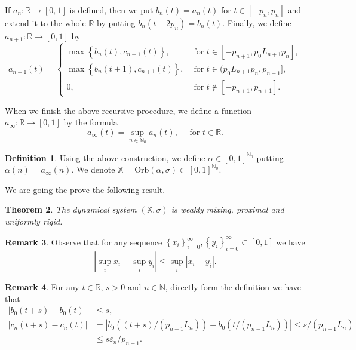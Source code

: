 \documentclass[reqno,a4paper,12pt]{amsart}
\newtheorem{thm}{Theorem}[section]
\theoremstyle{definition}
\newtheorem{defn}[thm]{Definition}
\newtheorem{rem}[thm]{Remark}
\numberwithin{equation}{section}
\begin{document}
If $a_n\colon \mathbb{R}\to[0,1]$ is defined, then we
put $b_n(t)=a_n(t)$ for $t\in [-p_n,p_n]$ and extend it to the whole ${\mathbb{R}}$ by putting $b_n(t+2p_n)=b_n(t)$.
Finally, we define $a_{n+1}\colon {\mathbb{R}}\to [0,1]$ by
\[
a_{n+1}(t)=\begin{cases}
\max{\left\{{b_n(t),c_{n+1}(t)}\right\}}, &\text{ for }t\in [-p_{n+1}, p_0 L_{n+1} p_n],\\
\max{\left\{{b_n(t+1),c_{n+1}(t)}\right\}}, &\text{ for }t\in (p_0 L_{n+1} p_n,p_{n+1}],\\
0, &\text{ for } t\not \in [-p_{n+1},p_{n+1}].
\end{cases}
\]

When we finish the above recursive procedure, we define a function $a_{\infty}\colon {\mathbb{R}} \to [0,1]$
by the formula
\[a_\infty(t)=\sup_{n\in{\mathbb{N}}_0} a_n(t),\quad \text{ for } t\in{\mathbb{R}}.\]

\begin{defn}
Using the above construction, we define $\alpha\in [0,1]^{{\mathbb{N}}_0}$ putting $\alpha(n)=a_{\infty}(n)$.
We denote $\mathbb{X} = \overline{{\mbox{Orb}}(\alpha,\sigma)}\subset [0,1]^{{\mathbb{N}}_0}$.
\end{defn}
We are going the prove the following result.
\begin{thm}\label{thm:main_wm}
The dynamical system $(\mathbb{X},\sigma)$ is weakly mixing, proximal and uniformly rigid.
\end{thm}

\begin{rem}\label{rem_11}
Observe that for any sequence ${\left\{{x_i}\right\}}_{i=0}^\infty, {\left\{{y_i}\right\}}_{i=0}^\infty \subset [0,1]$
we have
\[
|\sup_{i} x_i - \sup_i y_i|\leq \sup_i |x_i-y_i|.\]
\end{rem}

\begin{rem}
For any $t\in {\mathbb{R}}$, $s>0$ and $n\in{\mathbb{N}}$, directly form the definition we have that
\begin{align*}
|b_0(t+s)-b_{0}(t)|&\leq s,\\
|c_n(t+s)-c_{n}(t)|&=|b_0((t+s)/(p_{n-1}L_{n}))-b_{0}(t/(p_{n-1}L_{n}))|\leq s/(p_{n-1}L_{n})\\
&\leq s{\varepsilon}_n/p_{n-1}.
\end{align*}
\end{rem}
\end{document}

